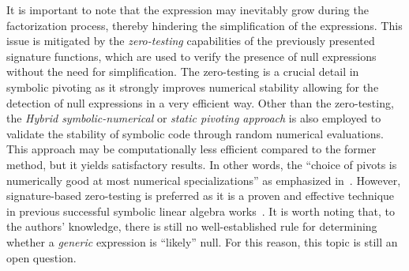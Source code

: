 It is important to note that the expression may inevitably grow during the factorization process, thereby hindering the simplification of the expressions. This issue is mitigated by the \emph{zero-testing} capabilities of the previously presented signature functions, which are used to verify the presence of null expressions without the need for simplification. The zero-testing is a crucial detail in symbolic pivoting as it strongly improves numerical stability allowing for the detection of null expressions in a very efficient way. Other than the zero-testing, the \emph{Hybrid symbolic-numerical} or \emph{static pivoting approach} is also employed to validate the stability of symbolic code through random numerical evaluations. This approach may be computationally less efficient compared to the former method, but it yields satisfactory results. In other words, the ``choice of pivots is numerically good at most numerical specializations'' as emphasized in~\cite{giesbrecht2014symbolic}. However, signature-based zero-testing is preferred as it is a proven and effective technique in previous successful symbolic linear algebra works~\cite{carette2006linear, zhou2007symbolic}. It is worth noting that, to the authors' knowledge, there is still no well-established rule for determining whether a \emph{generic} expression is ``likely'' null. For this reason, this topic is still an open question.

